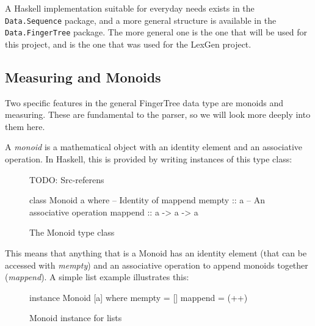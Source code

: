 \documentclass[a4paper,12pt,twosided]{report}
\begin{document}
A Haskell implementation suitable for everyday needs exists in the
\texttt{Data.Sequence} package, and a more general structure is available in the
\texttt{Data.FingerTree} package. The more general one is the one that will be
used for this project, and is the one that was used for the LexGen project.

\subsection{Measuring and Monoids}
Two specific features in the general FingerTree data type are monoids and
measuring. These are fundamental to the parser, so we will look more deeply into
them here.

A \textit{monoid} is a mathematical object with an identity element and an
associative operation. In Haskell, this is provided by writing instances of this
type class:
\begin{figure}[H]
TODO: Src-referens
\begin{code}
class Monoid a where
    -- Identity of mappend
    mempty  :: a
    -- An associative operation
    mappend :: a -> a -> a
\end{code}
\caption{The Monoid type class}
\end{figure}
This means that anything that is a Monoid has an identity element (that can be
accessed with \textit{mempty}) and an associative operation to append monoids
together (\textit{mappend}). A simple list example illustrates this:
\begin{figure}[H]
\begin{code}
instance Monoid [a] where
    mempty = []
    mappend = (++)
\end{code}
\caption{Monoid instance for lists}
\end{figure}
\end{document}

